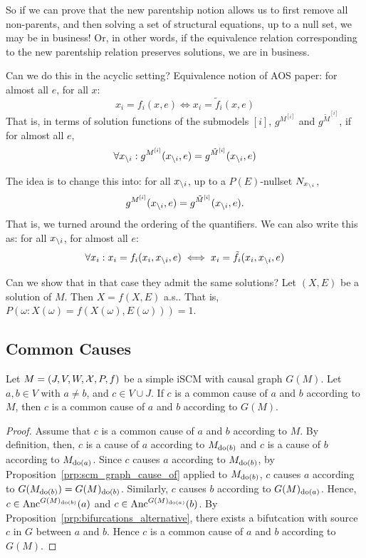 {%


  So if we can prove that the new parentship notion allows us to first remove all non-parents, and then solving a set
  of structural equations, up to a null set, we may be in business! Or, in other words, if the equivalence relation
  corresponding to the new parentship relation preserves solutions, we are in business.

  Can we do this in the acyclic setting?
  Equivalence notion of AOS paper: for almost all $e$, for all $x$:
  $$x_i = f_i(x,e) \iff x_i = \tilde{f}_i(x,e)$$
  That is, in terms of solution functions of the submodels $[i]$, $g^{M^{[i]}}$ and $g^{\tilde{M}^{[i]}}$,
  if for almost all $e$,
  $$\forall x_{\setminus i}: g^{M^{[i]}}(x_{\setminus i},e) = g^{\tilde{M}^{[i]}}(x_{\setminus i},e)$$

  The idea is to change this into: for all $x_{\setminus i}$, up to a $P(E)$-nullset $N_{x_{\setminus i}}$,
  $$g^{M^{[i]}}(x_{\setminus i},e) = g^{\tilde{M}^{[i]}}(x_{\setminus i},e).$$
  That is, we turned around the ordering of the quantifiers.
  We can also write this as: for all $x_{\setminus i}$, for almost all $e$:
  $$\forall x_i: x_i = f_i(x_i,x_{\setminus i},e) \iff x_i = \tilde{f}_i(x_i,x_{\setminus i},e)$$

  Can we show that in that case they admit the same solutions?
  Let $(X,E)$ be a solution of $M$. Then $X=f(X,E)$ a.s..
  That is, $P(\omega : X(\omega)=f(X(\omega),E(\omega)))=1$.
  }


\subsection{Common Causes}

\begin{Prp}\label{prp:scm_graph_common_cause}
  Let $M = \left ( J, V, W, \mathcal{X}, P, f \right )$ be a simple iSCM with causal graph $G(M)$.
  Let $a, b \in V$ with $a \ne b$, and $c \in V \cup J$.
  If $c$ is a common cause of $a$ and $b$ according to $M$, then $c$ is a common cause of $a$ and $b$ according to $G(M)$.
\end{Prp}
\begin{proof}
  Assume that $c$ is a common cause of $a$ and $b$ according to $M$.
  By definition, then, $c$ is a cause of $a$ according to $M_{\operatorname{do}(b)}$ and $c$ is a cause of $b$ according to $M_{\operatorname{do}(a)}$.
  Since $c$ causes $a$ according to $M_{\operatorname{do}(b)}$, by Proposition~\ref{prp:scm_graph_cause_of} applied to $M_{\operatorname{do}(b)}$, $c$ causes $a$ according to $G(M_{\operatorname{do}(b)}) = G(M)_{\operatorname{do}(b)}$.
  Similarly, $c$ causes $b$ according to $G(M)_{\operatorname{do}(a)}$.
  Hence, $c \in \mathrm{Anc}^{G(M)_{\operatorname{do}(b)}}(a)$ and $c \in \mathrm{Anc}^{G(M)_{\operatorname{do}(a)}}(b)$.
  By Proposition~\ref{prp:bifurcations_alternative}, there exists a bifutcation with source $c$ in $G$ between $a$ and $b$.
  Hence $c$ is a common cause of $a$ and $b$ according to $G(M)$.
\end{proof}
 

